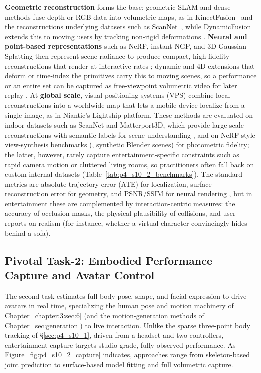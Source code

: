 \textbf{Geometric reconstruction} forms the base: geometric SLAM and dense methods fuse depth or RGB data into volumetric maps, as in KinectFusion~\cite{newcombe2011kinectfusion} and the reconstructions underlying datasets such as ScanNet~\cite{dai2017scannet}, while DynamicFusion extends this to moving users by tracking non-rigid deformations \cite{newcombe2015dynamicfusion}. 
\textbf{Neural and point-based representations} such as NeRF, instant-NGP, and 3D Gaussian Splatting then represent scene radiance to produce compact, high-fidelity reconstructions that render at interactive rates \cite{mildenhall2021nerf,muller2022instant,kerbl20233d}; dynamic and 4D extensions that deform or time-index the primitives carry this to moving scenes, so a performance or an entire set can be captured as free-viewpoint volumetric video for later replay \cite{yang2024deformable,wu20244d}. At \textbf{global scale}, visual positioning systems (VPS) combine local reconstructions into a worldwide map that lets a mobile device localize from a single image, as in Niantic's Lightship platform. These methods are evaluated on indoor datasets such as ScanNet and Matterport3D, which provide large-scale reconstructions with semantic labels for scene understanding \cite{dai2017scannet,chang2017matterport3d}, and on NeRF-style view-synthesis benchmarks (\eg, synthetic Blender scenes) for photometric fidelity; the latter, however, rarely capture entertainment-specific constraints such as rapid camera motion or cluttered living rooms, so practitioners often fall back on custom internal datasets (Table~\ref{tab:p4_s10_2_benchmarks}). 
The standard metrics are absolute trajectory error (ATE) for localization, surface reconstruction error for geometry, and PSNR/SSIM for neural rendering \cite{mildenhall2021nerf,kerbl20233d}, but in entertainment these are complemented by interaction-centric measures: the accuracy of occlusion masks, the physical plausibility of collisions, and user reports on realism (for instance, whether a virtual character convincingly hides behind a sofa).

\subsection{Pivotal Task-2: Embodied Performance Capture and Avatar Control}
\label{subsec:p4-sec10-2-pivotal-task-2-embodied-performance-capture-and-avatar-control}
The second task estimates full-body pose, shape, and facial expression to drive avatars in real time, specializing the human pose and motion machinery of Chapter~\ref{chapter:3:sec:6} (and the motion-generation methods of Chapter~\ref{sec:generation}) to live interaction. Unlike the sparse three-point body tracking of §\ref{sec:p4_s10_1}, driven from a headset and two controllers, entertainment capture targets studio-grade, fully-observed performance.
As Figure~\ref{fig:p4_s10_2_capture} indicates, approaches range from skeleton-based joint prediction to surface-based model fitting and full volumetric capture.

